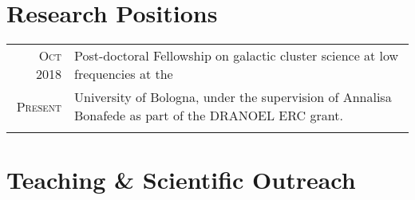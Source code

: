 \documentclass[10pt]{article} %
\begin{document}
\section{Research Positions}

\begin{tabular}{r|p{12.5cm}}
	\textsc{Oct 2018} & Post-doctoral Fellowship on galactic cluster science at low frequencies at the\\
	\textsc{Present}& University of Bologna, under the supervision of Annalisa Bonafede as part of the
	DRANOEL ERC grant.\\
	\multicolumn{2}{c}{} \\
\end{tabular}

\section{Teaching \& Scientific Outreach}
\end{document}
